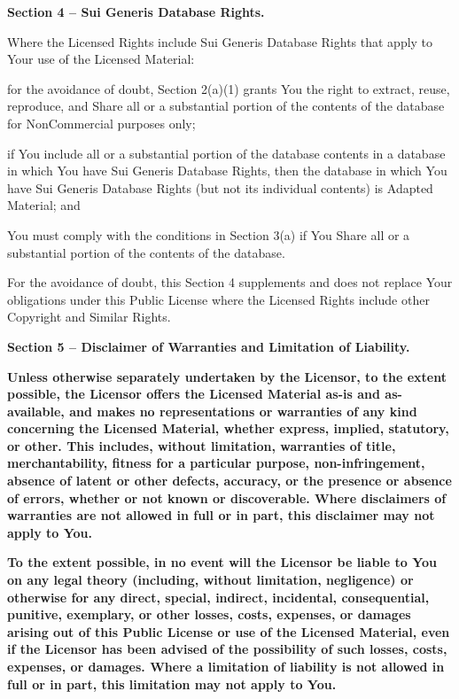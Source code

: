 \par \textbf{Section 4 – Sui Generis Database Rights.}
\par Where the Licensed Rights include Sui Generis Database Rights that apply to Your use of the Licensed Material:
\begin{doclicense@enumerate}
\item for the avoidance of doubt, Section 2(a)(1) grants You the right to extract, reuse, reproduce, and Share all or a substantial portion of the contents of the database for NonCommercial purposes only;
\item if You include all or a substantial portion of the database contents in a database in which You have Sui Generis Database Rights, then the database in which You have Sui Generis Database Rights (but not its individual contents) is Adapted Material; and
\item You must comply with the conditions in Section 3(a) if You Share all or a substantial portion of the contents of the database.
\end{doclicense@enumerate}
For the avoidance of doubt, this Section 4 supplements and does not replace Your obligations under this Public License where the Licensed Rights include other Copyright and Similar Rights.
\par \textbf{Section 5 – Disclaimer of Warranties and Limitation of Liability.}
\begin{doclicense@enumerate}
\item \textbf{Unless otherwise separately undertaken by the Licensor, to the extent possible, the Licensor offers the Licensed Material as-is and as-available, and makes no representations or warranties of any kind concerning the Licensed Material, whether express, implied, statutory, or other. This includes, without limitation, warranties of title, merchantability, fitness for a particular purpose, non-infringement, absence of latent or other defects, accuracy, or the presence or absence of errors, whether or not known or discoverable. Where disclaimers of warranties are not allowed in full or in part, this disclaimer may not apply to You.}
\item \textbf{To the extent possible, in no event will the Licensor be liable to You on any legal theory (including, without limitation, negligence) or otherwise for any direct, special, indirect, incidental, consequential, punitive, exemplary, or other losses, costs, expenses, or damages arising out of this Public License or use of the Licensed Material, even if the Licensor has been advised of the possibility of such losses, costs, expenses, or damages. Where a limitation of liability is not allowed in full or in part, this limitation may not apply to You.}
\end{doclicense@enumerate}

